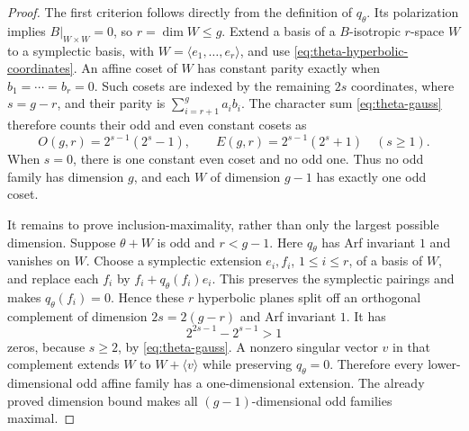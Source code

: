 \begin{proof}
The first criterion follows directly from the definition of \(q_\theta\).
Its polarization implies \(B|_{W\times W}=0\), so \(r=\dim W\leq g\).
Extend a basis of a \(B\)-isotropic \(r\)-space \(W\) to a symplectic
basis, with \(W=\langle e_1,\ldots,e_r\rangle\), and use
\eqref{eq:theta-hyperbolic-coordinates}. An affine coset of \(W\) has
constant parity exactly when \(b_1=\cdots=b_r=0\).
Such cosets are indexed by the remaining \(2s\) coordinates, where
\(s=g-r\), and their parity is
\(\sum_{i=r+1}^g a_ib_i\). The character sum \eqref{eq:theta-gauss}
therefore counts their odd and even constant cosets as
\begin{equation}
 O(g,r)=2^{s-1}(2^s-1),\qquad E(g,r)=2^{s-1}(2^s+1)
 \quad(s\geq1).
 \label{eq:constant-coset-count}
\end{equation}
When \(s=0\), there is one constant even coset and no odd one.
Thus no odd family has dimension \(g\), and each \(W\) of dimension
\(g-1\) has exactly one odd coset.

It remains to prove inclusion-maximality, rather than only the largest
possible dimension. Suppose \(\theta+W\) is odd and \(r<g-1\).
Here \(q_\theta\) has Arf invariant \(1\) and vanishes on \(W\).
Choose a symplectic extension \(e_i,f_i\), \(1\leq i\leq r\), of a basis
of \(W\), and replace each \(f_i\) by
\(f_i+q_\theta(f_i)e_i\). This preserves the symplectic pairings and makes
\(q_\theta(f_i)=0\). Hence these \(r\) hyperbolic planes split off an
orthogonal complement of dimension \(2s=2(g-r)\) and Arf invariant \(1\).
It has
\[
 2^{2s-1}-2^{s-1}>1
\]
zeros, because \(s\geq2\), by \eqref{eq:theta-gauss}. A nonzero singular
vector \(v\) in that complement extends \(W\) to \(W+\langle v\rangle\)
while preserving \(q_\theta=0\). Therefore every lower-dimensional odd
affine family has a one-dimensional extension. The already proved
dimension bound makes all \((g-1)\)-dimensional odd families maximal.


\end{proof}
